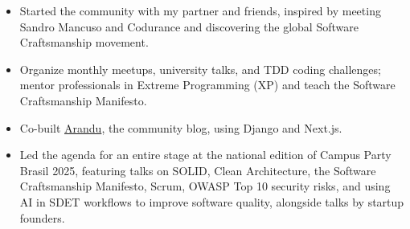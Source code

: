 \documentclass[10pt,a4paper]{altacv}
\begin{document}
\begin{itemize}
\setlength{\itemindent}{0.5em}
\item[--] Started the community with my partner and friends, inspired by meeting Sandro Mancuso and Codurance and discovering the global Software Craftsmanship movement.
\item[--] Organize monthly meetups, university talks, and TDD coding challenges; mentor professionals in Extreme Programming (XP) and teach the Software Craftsmanship Manifesto.
\item[--] Co-built \href{https://dwcorp.com.br/arandu}{Arandu}, the community blog, using Django and Next.js.
\item[--] Led the agenda for an entire stage at the national edition of Campus Party Brasil 2025, featuring talks on SOLID, Clean Architecture, the Software Craftsmanship Manifesto, Scrum, OWASP Top 10 security risks, and using AI in SDET workflows to improve software quality, alongside talks by startup founders.
\end{itemize}

\break
\newpage
{}

\end{document}
